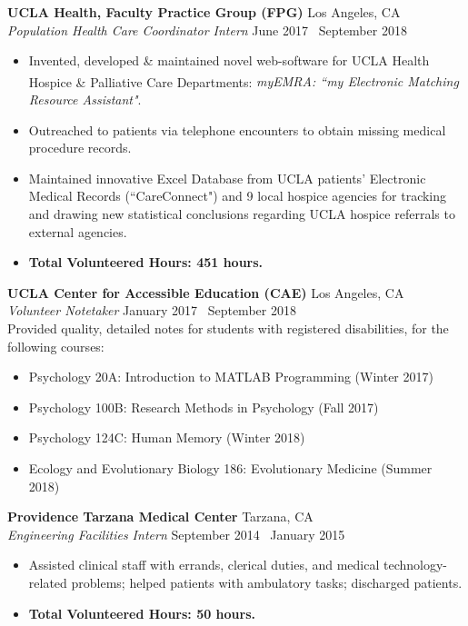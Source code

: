 \documentclass[margin]{res}
\begin{document}
\begin{resume}
		{\bf UCLA Health, Faculty Practice Group (FPG)} \hfill Los Angeles, CA \\
		{\it Population Health Care Coordinator Intern} \hfill June 2017 \textendash\ September 2018
		\begin{itemize} \itemsep -2pt
			\item Invented, developed \& maintained novel web-software for UCLA Health Hospice \& Palliative Care Departments: {\it myEMRA\textsuperscript{\textregistered}: ``my Electronic Matching Resource Assistant"}.
			\item Outreached to patients via telephone encounters to obtain missing medical procedure records.
			\item Maintained innovative Excel Database from UCLA patients' Electronic Medical Records (``CareConnect") and 9 local hospice agencies for tracking and drawing new statistical conclusions regarding UCLA hospice referrals to external agencies.
			\item {\bf Total Volunteered Hours: 451 hours.}
		\end{itemize}
		
		{\bf UCLA Center for Accessible Education (CAE)} \hfill Los Angeles, CA \\
		{\it Volunteer Notetaker} \hfill January 2017 \textendash\ September 2018 \\
		Provided quality, detailed notes for students with registered disabilities, for the following courses:
		\begin{itemize} \itemsep -2pt
			\item Psychology 20A: Introduction to MATLAB Programming (Winter 2017)
			\item Psychology 100B: Research Methods in Psychology (Fall 2017)
			\item Psychology 124C: Human Memory (Winter 2018)
			\item Ecology and Evolutionary Biology 186: Evolutionary Medicine (Summer 2018)
		\end{itemize}
		
		{\bf Providence Tarzana Medical Center} \hfill Tarzana, CA \\
		{\it Engineering Facilities Intern} \hfill September 2014 \textendash\ January 2015
		\begin{itemize} \itemsep -2pt
			\item Assisted clinical staff with errands, clerical duties, and medical technology-related problems; helped patients with ambulatory tasks; discharged patients.
			\item {\bf Total Volunteered Hours: 50 hours.}
		\end{itemize}
		

\end{resume}
\end{document}
